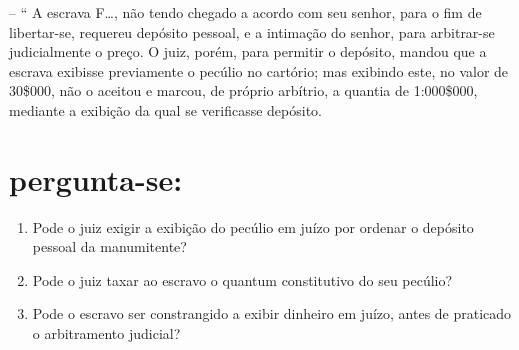 -- `` A escrava F\ldots{}, não tendo chegado a acordo com seu senhor, para o
fim de libertar-se, requereu depósito pessoal, e a intimação do senhor,
para arbitrar-se judicialmente o preço. O juiz, porém, para permitir o
depósito, mandou que a escrava exibisse previamente o pecúlio no
cartório; mas exibindo este, no valor de 30\$000, não o aceitou e
marcou, de próprio arbítrio, a quantia de 1:000\$000, mediante a
exibição da qual se verificasse depósito.

\section{pergunta-se:}

\begin{enumerate}[label=\arabic*º]
\item Pode o juiz exigir a exibição do pecúlio em juízo por ordenar o
depósito pessoal da manumitente?

\item Pode o juiz taxar ao escravo o quantum constitutivo do seu
pecúlio?

\item Pode o escravo ser constrangido a exibir dinheiro em juízo, antes
de praticado o arbitramento judicial?
\end{enumerate}

